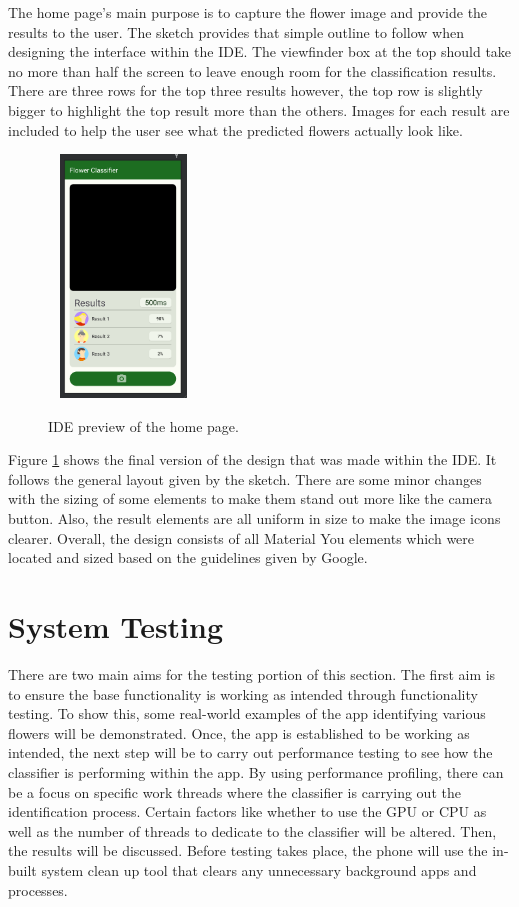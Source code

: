 \documentclass[12pt,a4paper]{report}
\begin{document}
The home page's main purpose is to capture the flower image and provide the results to the user. The sketch provides 
that simple outline to follow when designing the interface within the IDE. The viewfinder box at the top should take no 
more than half the screen to leave enough room for the classification results. There are three rows for the top three 
results however, the top row is slightly bigger to highlight the top result more than the others. Images for each result
are included to help the user see what the predicted flowers actually look like.

\begin{figure}[h]\
    \centering
    \includegraphics[width=0.3\textwidth]{IDE_Ver.png}
    \caption{IDE preview of the home page.}
    \label{fig:final_des}
\end{figure}

\break

Figure \ref{fig:final_des} shows the final version of the design that was made within the IDE. It follows the general 
layout given by 
the sketch. There are some minor changes with the sizing of some elements to make them stand out more like the camera 
button. Also, the result elements are all uniform in size to make the image icons clearer. Overall, the design consists 
of all Material You elements which were located and sized based on the guidelines given by Google. 


\section{System Testing}

There are two main aims for the testing portion of this section. The first aim is to ensure the base 
functionality is working as intended through functionality testing. To show this, some real-world examples of the app 
identifying various flowers will be demonstrated. Once, the app is established to be working as intended, the next step will be to carry out 
performance testing to see how the classifier is performing within the app. By using performance profiling, there can be a focus
on specific work threads where the classifier is carrying out the identification process. Certain factors 
like whether to use the GPU or CPU as well as the number of threads to dedicate to the classifier will be altered. Then,
the results will be discussed. Before testing takes place, the phone will use the in-built system clean up tool that 
clears any unnecessary background apps and processes.
\end{document}
